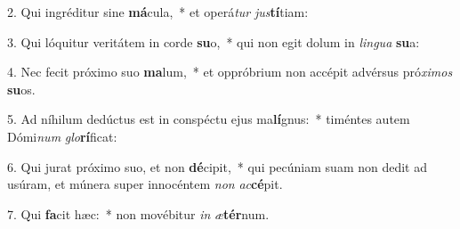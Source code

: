 2. Qui ingréditur sine \textbf{má}cula,~*  et operá\textit{tur} \textit{jus}\textbf{tí}tiam:\

3. Qui lóquitur veritátem in corde \textbf{su}o,~*  qui non egit dolum in \textit{lin}\textit{gua} \textbf{su}a:\

4. Nec fecit próximo suo \textbf{ma}lum,~*  et oppróbrium non accépit advérsus pró\textit{xi}\textit{mos} \textbf{su}os.\

5. Ad níhilum dedúctus est in conspéctu ejus ma\textbf{lí}gnus:~*  timéntes autem Dómi\textit{num} \textit{glo}\textbf{rí}ficat:\

6. Qui jurat próximo suo, et non \textbf{dé}cipit,~*  qui pecúniam suam non dedit ad usúram, et múnera super innocéntem \textit{non} \textit{ac}\textbf{cé}pit.\

7. Qui \textbf{fa}cit hæc:~*  non movébitur \textit{in} \textit{æ}\textbf{tér}num.\

